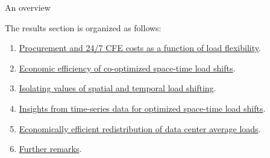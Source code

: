 \begin{frame}{An overview}

  {\small 

  The results section is organized as follows:

  \begin{enumerate}

  \item \hyperlink{sec:procurement}{Procurement and 24/7 CFE costs as a function of load flexibility}.
  \item \hyperlink{sec:efficiency}{Economic efficiency of co-optimized space-time load shifts}.
  \item \hyperlink{isolated-hook}{Isolating values of spatial and temporal load shifting}.
  \item \hyperlink{ssec:time-series}{Insights from time-series data for optimized space-time load shifts}.
  \item \hyperlink{ssec:redistribution}{Economically efficient redistribution of data center average loads}.
  \item \hyperlink{ssec:remarks}{Further remarks}.

  \end{enumerate}
  }
  \end{frame}




